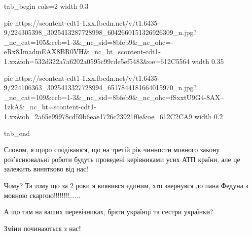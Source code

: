 \ifcmt
  tab_begin cols=2
		width 0.3

     pic https://scontent-cdt1-1.xx.fbcdn.net/v/t1.6435-9/224305398_3025413287728998_6042660151326926309_n.jpg?_nc_cat=105&ccb=1-3&_nc_sid=8bfeb9&_nc_ohc=-eRx8JmadmEAX8BR0VH&_nc_ht=scontent-cdt1-1.xx&oh=532d322a7a6202a0595c99cde5ef5483&oe=612C5564
		width 0.35

     pic https://scontent-cdt1-1.xx.fbcdn.net/v/t1.6435-9/224106363_3025413327728994_6517844181664015970_n.jpg?_nc_cat=109&ccb=1-3&_nc_sid=8bfeb9&_nc_ohc=fSxxtU9G4-8AX--1zkA&_nc_ht=scontent-cdt1-1.xx&oh=2a65e99978cd59b6eae1726c23921f0e&oe=612C2CA9
		width 0.2

  tab_end
\fi

Словом, я щиро сподіваюся, що на третій рік чинности мовного закону
роз'яснювальні роботи будуть проведені керівниками усих АТП країни, але це
залежить винятково від нас!

Чому? Та тому що за 2 роки я виявився єдиним, хто звернувся до пана Федуна з мовною скаргою!!!!!!!!......

А що там на ваших перевізниках, брати українці та сестри українки?

Зміни починаються з нас!


